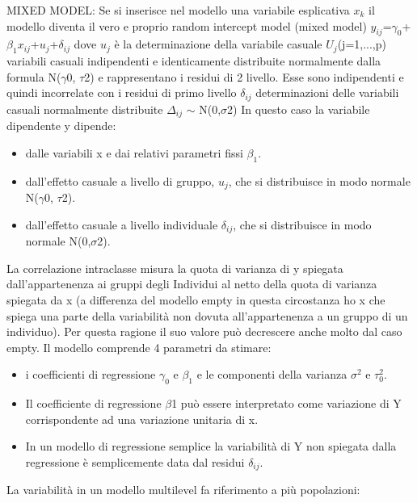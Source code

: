 \documentclass[a4page, 11pt]{article}
\begin{document}
\newline
\newline
MIXED MODEL: 
\newline
Se si inserisce nel modello una variabile esplicativa $x_k$ il modello diventa il vero e proprio random intercept model (mixed model) $y_{ij}$=$\gamma_0$+$\beta_1$$x_{ij}$+$u_j$+$\delta_{ij}$ dove $u_j$ è la determinazione della variabile casuale $U_j$(j=1,...,p) variabili casuali indipendenti e identicamente distribuite normalmente dalla formula N($\gamma$0, $\tau$2) e rappresentano i residui di 2 livello. Esse sono indipendenti e quindi incorrelate con i residui di primo livello $\delta_{ij}$ determinazioni delle variabili casuali normalmente distribuite $\Delta_{ij}$ $\sim$ N(0,$\sigma$2)
\newline
\newline
In questo caso la variabile dipendente y dipende:
\begin{itemize}
\item dalle variabili x e dai relativi parametri fissi $\beta_1$.
\item dall’effetto casuale a livello di gruppo, $u_j$, che si distribuisce in modo normale  N($\gamma$0, $\tau$2).
\item dall’effetto casuale a livello individuale $\delta_{ij}$, che si distribuisce in modo normale N(0,$\sigma$2).
\end{itemize}
La correlazione intraclasse misura la quota di varianza di y spiegata dall’appartenenza ai gruppi degli Individui al netto della quota di varianza spiegata da x (a differenza del modello empty in questa circostanza ho x che spiega una parte della variabilità non dovuta all’appartenenza a un gruppo di un individuo). Per questa ragione il suo valore può decrescere anche molto dal caso empty. Il modello comprende 4 parametri da stimare:
\begin{itemize}
\item i coefficienti di regressione $\gamma_0$ e $\beta_1$ e le componenti della varianza $\sigma^{2}$ e $\tau^{2}_0$.
\item Il coefficiente di regressione $\beta$1 può essere interpretato come variazione di Y corrispondente ad una variazione unitaria di x.
\item In un modello di regressione semplice la variabilità di Y non spiegata dalla regressione è semplicemente data dal residui $\delta_{ij}$.
\end{itemize}
La variabilità in un modello multilevel fa riferimento a più popolazioni:
\begin{itemize}

\end{itemize}$$
\end{document}
